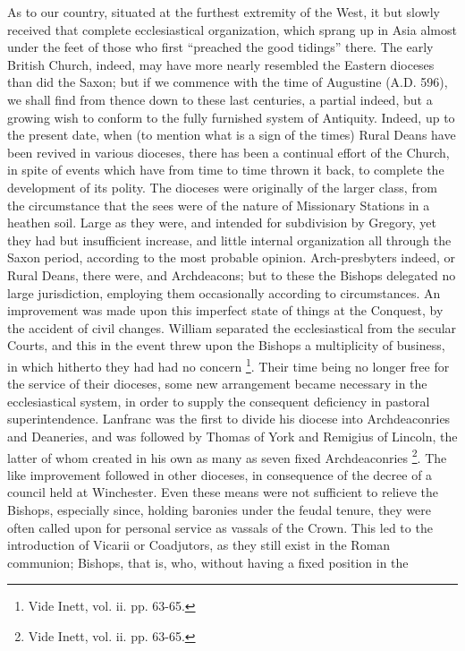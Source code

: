 As to our country, situated at the furthest
extremity of the West, it but slowly received that complete
ecclesiastical organization, which sprang up in Asia almost under the
feet of those who first ``preached the good tidings'' there. The early
British Church, indeed, may have more nearly resembled the Eastern
dioceses than did the Saxon; but if we commence with the time of
Augustine (A.D. 596), we shall
find from thence down to these last centuries, a partial indeed, but a
growing wish to conform to the fully furnished system of Antiquity.
Indeed, up to the present date, when (to mention what is a sign of the
times) Rural Deans have been revived in various dioceses, there has
been a continual effort of the Church, in spite of events which have
from time to time thrown it back, to complete the development of its
polity. The dioceses were originally of the larger class, from
the circumstance that the sees were of the nature of Missionary
Stations in a heathen soil. Large as they were, and intended for
subdivision by Gregory, yet they had but insufficient increase, and
little internal organization all through the Saxon period, according
to the most probable opinion. Arch-presbyters indeed, or Rural Deans,
there were, and Archdeacons; but to these the Bishops delegated no
large jurisdiction, employing them occasionally according to
circumstances. An improvement was made upon this imperfect state of
things at the Conquest, by the accident of civil changes. William
separated the ecclesiastical from the secular Courts, and this in the
event threw upon the Bishops a multiplicity of business, in which
hitherto they had had no concern \footnote{Vide Inett, vol. ii. pp. 63-65.}. Their time being no longer free for the service of their
dioceses, some new arrangement became necessary in the ecclesiastical
system, in order to supply the consequent deficiency in pastoral
superintendence. Lanfranc was the first to divide his diocese into
Archdeaconries and Deaneries, and was followed by Thomas of York and
Remigius of Lincoln, the latter of whom created in his own as many as
seven fixed Archdeaconries \footnote{Vide Inett, vol. ii. pp. 63-65.}. The
like improvement followed in other dioceses, in consequence of the
decree of a council held at Winchester. Even these means were not
sufficient to relieve the Bishops, especially since, holding baronies
under the feudal tenure, they were often called upon for personal
service as vassals of the Crown. This led to the introduction of
Vicarii or Coadjutors, as they still exist in the Roman communion;
Bishops, that is, who, without having a fixed position in the
